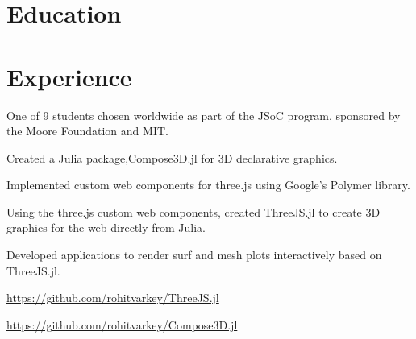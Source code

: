 \documentclass[]{deedy-resume-openfont}
\begin{document}
%
%


%
%



%
%

\begin{minipage}[t]{0.48\textwidth} 


\section{Education} 

\sectionsep


\section{Experience}

\vspace{\topsep} %
\begin{tightemize}
\item One of 9 students chosen worldwide as part of the JSoC program, sponsored by the Moore Foundation and MIT.
\item Created a Julia package,Compose3D.jl for 3D declarative graphics. 
\item Implemented custom web components for three.js using Google's Polymer library. 
\item Using the three.js custom web components, created ThreeJS.jl to create 3D graphics for the web directly from Julia.
\item Developed applications to render surf and mesh plots interactively based on ThreeJS.jl.
\item \href{https://github.com/rohitvarkey/ThreeJS.jl}{https://github.com/rohitvarkey/ThreeJS.jl}
\item \href{https://github.com/rohitvarkey/Compose3D.jl}{https://github.com/rohitvarkey/Compose3D.jl}
\end{tightemize}
\sectionsep


\end{minipage}
\end{document}

